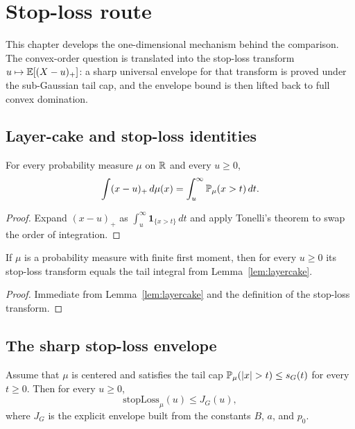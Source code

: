 \chapter{Stop-loss route}\label{chap:stoploss}

This chapter develops the one-dimensional mechanism behind the comparison.
The convex-order question is translated into the stop-loss transform
$u \mapsto \mathbb{E}[(X-u)_+]$: a sharp universal envelope for that transform is
proved under the sub-Gaussian tail cap, and the envelope bound is then
lifted back to full convex domination.

\section{Layer-cake and stop-loss identities}

\begin{lemma}\label{lem:layercake}
\leanok
For every probability measure $\mu$ on $\mathbb{R}$ and every $u \ge 0$,
\[
  \int (x-u)_+\,d\mu(x) = \int_u^\infty \mathbb{P}_\mu(x > t)\,dt.
\]
\end{lemma}

\begin{proof}\leanok
Expand $(x-u)_+$ as $\int_u^\infty \mathbf{1}_{\{x>t\}}\,dt$ and apply
Tonelli's theorem to swap the order of integration.
\end{proof}

\begin{lemma}\label{lem:stoploss-tail}
\leanok
If $\mu$ is a probability measure with finite first moment, then for every
$u \ge 0$ its stop-loss transform equals the tail integral from
Lemma~\ref{lem:layercake}.
\end{lemma}

\begin{proof}\leanok
Immediate from Lemma~\ref{lem:layercake} and the definition of the
stop-loss transform.
\end{proof}

\section{The sharp stop-loss envelope}

\begin{theorem}\label{thm:envelope}
\leanok
Assume that $\mu$ is centered and satisfies the tail cap
$\Prb_\mu(|x|>t)\le s_G(t)$ for every $t \ge 0$. Then for every $u \ge 0$,
\[
  \mathrm{stopLoss}_\mu(u) \le J_G(u),
\]
where $J_G$ is the explicit envelope built from the constants
$B$, $a$, and $p_0$.
\end{theorem}

